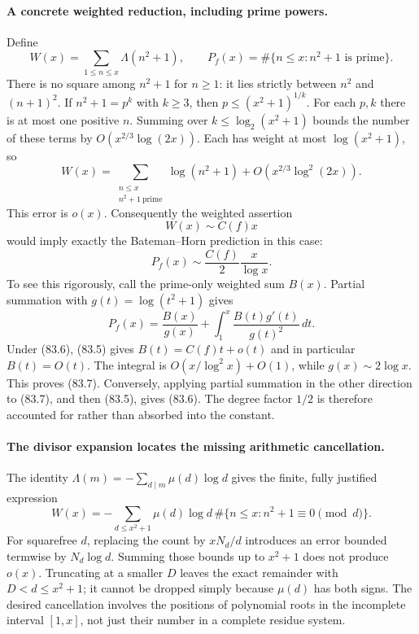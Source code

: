 \documentclass[11pt]{article}
\begin{document}
\paragraph{A concrete weighted reduction, including prime powers.}
Define
\[
 W(x)=\sum_{1\leq n\leq x}\Lambda(n^2+1),\qquad
 P_f(x)=\#\{n\leq x:n^2+1\text{ is prime}\}.
\]
There is no square among $n^2+1$ for $n\geq1$: it lies strictly between
$n^2$ and $(n+1)^2$. If $n^2+1=p^k$ with $k\geq3$, then
$p\leq(x^2+1)^{1/k}$. For each $p,k$ there is at most one positive $n$.
Summing over $k\leq\log_2(x^2+1)$ bounds the number of these terms by
$O(x^{2/3}\log(2x))$. Each has weight at most $\log(x^2+1)$, so
\[
 W(x)=\sum_{\substack{n\leq x\\n^2+1\ \mathrm{prime}}}
                \log(n^2+1)+O(x^{2/3}\log^2(2x)).       \tag{83.5}
\]
This error is $o(x)$. Consequently the weighted assertion
\[
                         W(x)\sim C(f)x                 \tag{83.6}
\]
would imply exactly the Bateman--Horn prediction in this case:
\[
                       P_f(x)\sim\frac{C(f)}2\frac{x}{\log x}.
                                                               \tag{83.7}
\]
To see this rigorously, call the prime-only weighted sum $B(x)$.
Partial summation with $g(t)=\log(t^2+1)$ gives
\[
 P_f(x)=\frac{B(x)}{g(x)}+
           \int_1^x\frac{B(t)g'(t)}{g(t)^2}\,dt.
\]
Under (83.6), (83.5) gives $B(t)=C(f)t+o(t)$ and in particular $B(t)=O(t)$.
The integral is $O(x/\log^2x)+O(1)$, while $g(x)\sim2\log x$.
This proves (83.7). Conversely, applying partial summation in the other
direction to (83.7), and then (83.5), gives (83.6). The degree factor
$1/2$ is therefore accounted for rather than absorbed into the constant.

\paragraph{The divisor expansion locates the missing arithmetic cancellation.}
The identity $\Lambda(m)=-\sum_{d\mid m}\mu(d)\log d$ gives the finite,
fully justified expression
\[
 W(x)=-\sum_{d\leq x^2+1}\mu(d)\log d\,
                     \#\{n\leq x:n^2+1\equiv0\pmod d\}.\tag{83.8}
\]
For squarefree $d$, replacing the count by $xN_d/d$ introduces an error
bounded termwise by $N_d\log d$. Summing those bounds up to $x^2+1$
does not produce $o(x)$. Truncating at a smaller $D$ leaves the exact
remainder with $D<d\leq x^2+1$; it cannot be dropped simply because
$\mu(d)$ has both signs. The desired cancellation involves the positions
of polynomial roots in the incomplete interval $[1,x]$, not just their
number in a complete residue system.
\end{document}
